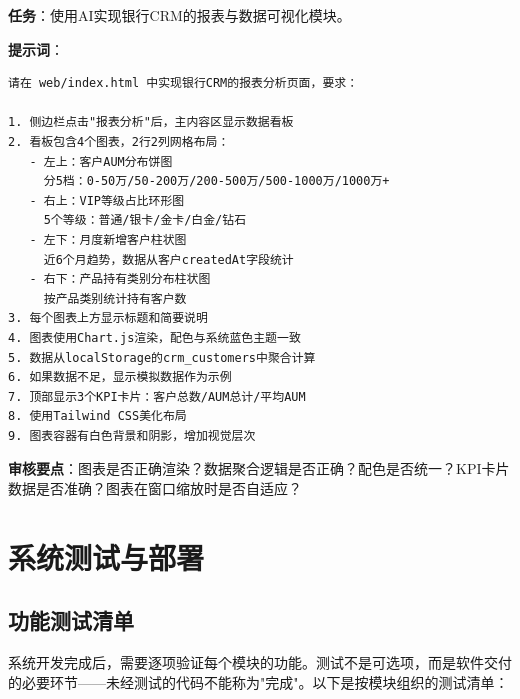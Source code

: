 \begin{practicebox}[用AI实现数据看板]
\textbf{任务}：使用AI实现银行CRM的报表与数据可视化模块。

\textbf{提示词}：

\begin{lstlisting}
请在 web/index.html 中实现银行CRM的报表分析页面，要求：

1. 侧边栏点击"报表分析"后，主内容区显示数据看板
2. 看板包含4个图表，2行2列网格布局：
   - 左上：客户AUM分布饼图
     分5档：0-50万/50-200万/200-500万/500-1000万/1000万+
   - 右上：VIP等级占比环形图
     5个等级：普通/银卡/金卡/白金/钻石
   - 左下：月度新增客户柱状图
     近6个月趋势，数据从客户createdAt字段统计
   - 右下：产品持有类别分布柱状图
     按产品类别统计持有客户数
3. 每个图表上方显示标题和简要说明
4. 图表使用Chart.js渲染，配色与系统蓝色主题一致
5. 数据从localStorage的crm_customers中聚合计算
6. 如果数据不足，显示模拟数据作为示例
7. 顶部显示3个KPI卡片：客户总数/AUM总计/平均AUM
8. 使用Tailwind CSS美化布局
9. 图表容器有白色背景和阴影，增加视觉层次
\end{lstlisting}

\textbf{审核要点}：图表是否正确渲染？数据聚合逻辑是否正确？配色是否统一？KPI卡片数据是否准确？图表在窗口缩放时是否自适应？
\end{practicebox}

\section{系统测试与部署}

\subsection{功能测试清单}

系统开发完成后，需要逐项验证每个模块的功能。测试不是可选项，而是软件交付的必要环节——未经测试的代码不能称为"完成"。以下是按模块组织的测试清单：

